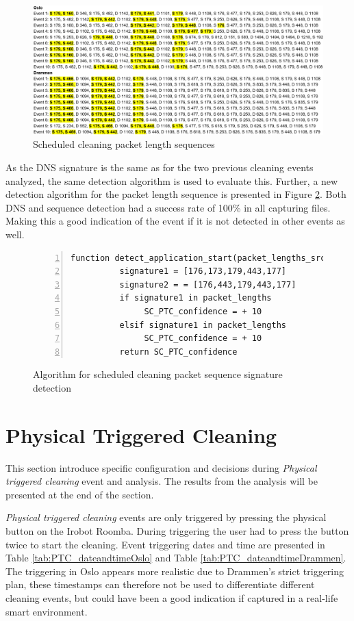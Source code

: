 \begin{figure}[H]
    \centering
    \includegraphics[width=\textwidth]{figures/Sequence_SC.png}
    \caption{Scheduled cleaning packet length sequences}
    \label{fig:Scseq}
\end{figure}

As the DNS signature is the same as for the two previous cleaning events analyzed, the same detection algorithm is used to evaluate this. Further, a new detection algorithm for the packet length sequence is presented in Figure \ref{fig:Sudo_code_SC_or_PC}. Both DNS and sequence detection had a success rate of 100\% in all capturing files. Making this a good indication of the event if it is not detected in other events as well. 

\begin{figure}[H]
    \centering
    \begin{lstlisting}[numbers=left]
     function detect_application_start(packet_lengths_src)
          signature1 = [176,173,179,443,177]
          signature2 = = [176,443,179,443,177]
          if signature1 in packet_lengths
               SC_PTC_confidence = + 10
          elsif signature1 in packet_lengths
               SC_PTC_confidence = + 10
          return SC_PTC_confidence
    \end{lstlisting}
    \caption{Algorithm for scheduled cleaning packet sequence signature detection}
    \label{fig:Sudo_code_SC_or_PC}
\end{figure}


\section{Physical Triggered Cleaning}
This section introduce specific configuration and decisions during \textit{Physical triggered cleaning} event and analysis. The results from the analysis will be presented at the end of the section.

\textit{Physical triggered cleaning} events are only triggered by pressing the physical button on the Irobot Roomba. During triggering the user had to press the button twice to start the cleaning. Event triggering dates and time are presented in Table \ref{tab:PTC_dateandtimeOslo} and Table \ref{tab:PTC_dateandtimeDrammen}. The triggering in Oslo appears more realistic due to Drammen's strict triggering plan, these timestamps can therefore not be used to differentiate different cleaning events, but could have been a good indication if captured in a real-life smart environment. 


